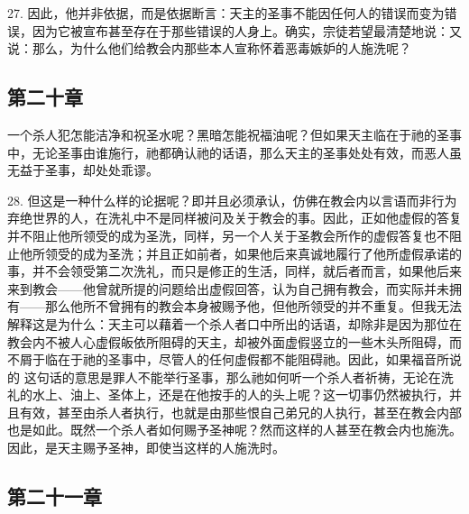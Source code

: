 27. 因此，他并非依据，而是依据断言：天主的圣事不能因任何人的错误而变为错误，因为它被宣布甚至存在于那些错误的人身上。确实，宗徒若望最清楚地说：又说：那么，为什么他们给教会内那些本人宣称怀着恶毒嫉妒的人施洗呢？\par


\subsection{第二十章}

一个杀人犯怎能洁净和祝圣水呢？黑暗怎能祝福油呢？但如果天主临在于祂的圣事中，无论圣事由谁施行，祂都确认祂的话语，那么天主的圣事处处有效，而恶人虽无益于圣事，却处处乖谬。\par

28. 但这是一种什么样的论据呢？即并且必须承认，仿佛在教会内以言语而非行为弃绝世界的人，在洗礼中不是同样被问及关于教会的事。因此，正如他虚假的答复并不阻止他所领受的成为圣洗，同样，另一个人关于圣教会所作的虚假答复也不阻止他所领受的成为圣洗；并且正如前者，如果他后来真诚地履行了他所虚假承诺的事，并不会领受第二次洗礼，而只是修正的生活，同样，就后者而言，如果他后来来到教会——他曾就所提的问题给出虚假回答，认为自己拥有教会，而实际并未拥有——那么他所不曾拥有的教会本身被赐予他，但他所领受的并不重复。但我无法解释这是为什么：天主可以藉着一个杀人者口中所出的话语，却除非是因为那位在教会内不被人心虚假皈依所阻碍的天主，却被外面虚假竖立的一些木头所阻碍，而不屑于临在于祂的圣事中，尽管人的任何虚假都不能阻碍祂。因此，如果福音所说的  这句话的意思是罪人不能举行圣事，那么祂如何听一个杀人者祈祷，无论在洗礼的水上、油上、圣体上，还是在他按手的人的头上呢？这一切事仍然被执行，并且有效，甚至由杀人者执行，也就是由那些恨自己弟兄的人执行，甚至在教会内部也是如此。既然一个杀人者如何赐予圣神呢？然而这样的人甚至在教会内也施洗。因此，是天主赐予圣神，即使当这样的人施洗时。\par


\subsection{第二十一章}

